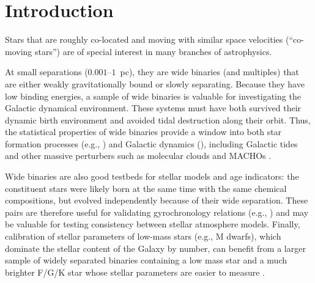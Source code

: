 \documentclass[manuscript, letterpaper]{aastex6}
\begin{document}

\section{Introduction} \label{sec:intro}

Stars that are roughly co-located and moving with similar space velocities
(``co-moving stars'') are of special interest in many branches of astrophysics.

At small separations ($0.001$--$1$~pc), they are wide binaries (and
multiples) that are either weakly gravitationally bound or
slowly separating.
Because they have low binding energies, a sample of wide binaries is valuable
for investigating the Galactic dynamical environment.
These systems must have both survived their dynamic birth environment and
avoided tidal destruction along their orbit.
Thus, the statistical properties of wide binaries provide a window into both star formation
processes (e.g., \citealt{Parker:2009aa}) and Galactic dynamics (\citealt{Heggie:1975aa}),
including Galactic tides and other massive perturbers such as molecular clouds
and MACHOs \citep{Weinberg:1987aa,Jiang:2010aa,Yoo:2004aa,Allen:2014aa}.

Wide binaries are also good testbeds for stellar models and age indicators:
the constituent stars were likely born at the same time with the same chemical
compositions, but evolved independently because of their wide separation.
These pairs are therefore useful for validating gyrochronology relations
(e.g., \citealt{Chaname:2012}) and may be valuable for testing consistency
between stellar atmosphere models.
Finally, calibration of stellar parameters of low-mass stars (e.g., M dwarfs),
which dominate the stellar content of the Galaxy by number, can benefit from
a larger sample of widely separated binaries containing a low mass star and a
much brighter F/G/K star whose stellar parameters are easier to measure
\citep[e.g.,][]{Rojas-Ayala:2012aa}.
\end{document}
